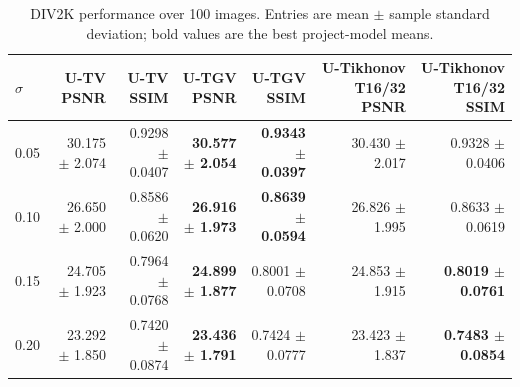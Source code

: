 \begin{table}[htbp]
\centering
\caption{DIV2K performance over 100 images. Entries are mean $\pm$ sample standard deviation; bold values are the best project-model means.}
\label{tab:div2k_project_models}
\begin{tabular}{lrrrrrr}
\toprule
$\sigma$ & U-TV PSNR & U-TV SSIM & U-TGV PSNR & U-TGV SSIM & U-Tikhonov T16/32 PSNR & U-Tikhonov T16/32 SSIM \\
\midrule
0.05 & 30.175 $\pm$ 2.074 & 0.9298 $\pm$ 0.0407 & \textbf{30.577 $\pm$ 2.054} & \textbf{0.9343 $\pm$ 0.0397} & 30.430 $\pm$ 2.017 & 0.9328 $\pm$ 0.0406 \\
0.10 & 26.650 $\pm$ 2.000 & 0.8586 $\pm$ 0.0620 & \textbf{26.916 $\pm$ 1.973} & \textbf{0.8639 $\pm$ 0.0594} & 26.826 $\pm$ 1.995 & 0.8633 $\pm$ 0.0619 \\
0.15 & 24.705 $\pm$ 1.923 & 0.7964 $\pm$ 0.0768 & \textbf{24.899 $\pm$ 1.877} & 0.8001 $\pm$ 0.0708 & 24.853 $\pm$ 1.915 & \textbf{0.8019 $\pm$ 0.0761} \\
0.20 & 23.292 $\pm$ 1.850 & 0.7420 $\pm$ 0.0874 & \textbf{23.436 $\pm$ 1.791} & 0.7424 $\pm$ 0.0777 & 23.423 $\pm$ 1.837 & \textbf{0.7483 $\pm$ 0.0854} \\
\bottomrule
\end{tabular}
\end{table}
